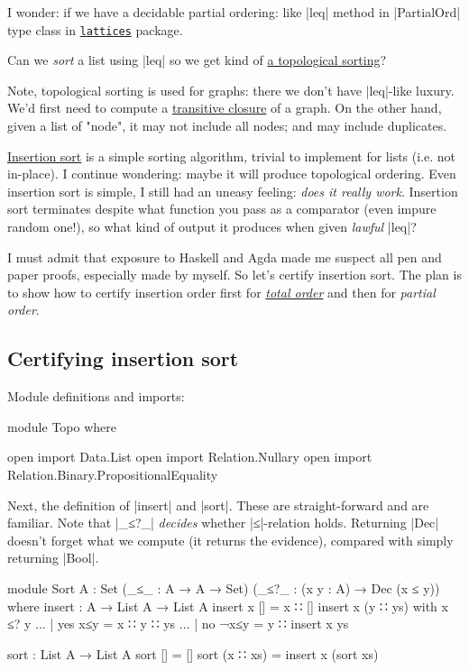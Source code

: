I wonder: if we have a decidable partial ordering:
like |leq| method in |PartialOrd| type class
in \href{https://hackage.haskell.org/package/lattices}{\texttt{lattices}} package.

Can we \emph{sort} a list using |leq| so we get kind of
\href{https://en.wikipedia.org/wiki/Topological_sorting}{a topological sorting}?

Note, topological sorting is used for graphs:
there we don't have |leq|-like luxury. We'd first need to compute
a \href{https://en.wikipedia.org/wiki/Transitive_closure}{transitive closure}
of a graph. On the other hand, given a list of "node", it may not
include all nodes; and may include duplicates.

\href{https://en.wikipedia.org/wiki/Insertion_sort}{Insertion sort}
is a simple sorting algorithm, trivial to implement for lists
(i.e. not in-place). I continue wondering: maybe it will produce
topological ordering. Even insertion sort is simple, I still had
an uneasy feeling: \emph{does it really work}. Insertion sort
terminates despite what function you pass as a comparator (even impure random one!),
so what kind of output it produces when given \emph{lawful} |leq|?

I must admit that exposure to Haskell and Agda made me suspect all
pen and paper proofs, especially made by myself. So let's certify
insertion sort. The plan is to show how to certify insertion
order first for \href{https://en.wikipedia.org/wiki/Total_order}{\emph{total order}}
and then for \emph{partial order}.

\subsection{Certifying insertion sort}

Module definitions and imports:

\begin{code}
module Topo where

open import Data.List
open import Relation.Nullary
open import Relation.Binary.PropositionalEquality
\end{code}

Next, the definition of |insert| and |sort|. These are straight-forward
and are familiar. Note that |_≤?_| \emph{decides} whether |≤|-relation
holds. Returning |Dec| doesn't forget what we compute (it returns the evidence),
compared with simply returning |Bool|.

\begin{code}
module Sort {A : Set} (_≤_ : A → A → Set)
  (_≤?_ : (x y : A) → Dec (x ≤ y))
  where
  insert : A → List A → List A
  insert x [] = x ∷ []
  insert x (y ∷ ys) with x ≤? y
  ... | yes x≤y = x ∷ y ∷ ys
  ... | no ¬x≤y = y ∷ insert x ys

  sort : List A → List A
  sort []       = []
  sort (x ∷ xs) = insert x (sort xs)
\end{code}

